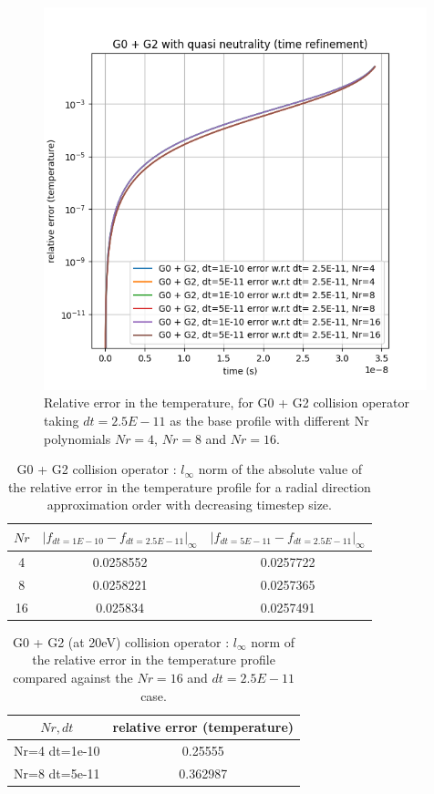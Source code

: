 \documentclass{article}
\begin{document}
\begin{figure}[H]
    \centering
    \includegraphics[width=0.99\textwidth]{dat/g02_dt.png}
    \caption{Relative error in the temperature, for G0 + G2 collision operator taking $dt=2.5E-11$ as the base profile with different Nr polynomials $Nr=4$, $Nr=8$ and $Nr=16$.}
\end{figure}

\begin{table}[H]
    \centering
    \begin{tabular}{|c|c|c|}
        \hline
        $Nr$ & $|f_{dt=1E-10}-f_{dt=2.5E-11}|_\infty$ & $|f_{dt=5E-11}-f_{dt=2.5E-11}|_\infty$ \\
        \hline
        4         &   0.0258552           & 0.0257722 \\
        8         &   0.0258221           & 0.0257365 \\
       16        &    0.025834            & 0.0257491 \\
        \hline
    \end{tabular}
    \caption{G0 + G2 collision operator : $l_\infty$ norm of the absolute value of the relative error in the temperature profile for a radial direction approximation order with decreasing timestep size. }
\end{table}

\begin{table}[H]
    \centering
    \begin{tabular}{|c|c|}
        \hline
        $Nr,dt$ & relative error (temperature)\\
        \hline
        Nr=4 dt=1e-10      &           0.25555 \\
        Nr=8 dt=5e-11      &           0.362987 \\
        \hline
    \end{tabular}
    \caption{G0 + G2 (at 20eV) collision operator : $l_\infty$ norm of the relative error in the temperature profile compared against the $Nr=16$ and $dt=2.5E-11$ case. }
\end{table}
\end{document}
